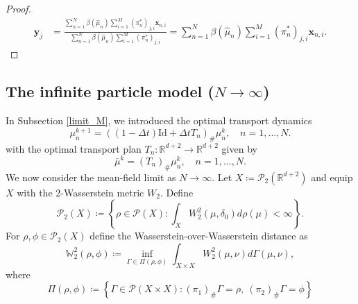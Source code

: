 \documentclass[a4paper, 11pt]{article}
\newcommand{\R}{\mathbb{R}}
\newcommand{\hmu}{\hat{\mu}_{n}}
\newcommand{\Pw}{\mathcal{P}_{2}\left( \R^{d+2} \right) }
\newcommand{\PPw}{\mathcal{P}_{2}\left(X\right)}
\theoremstyle{plain} %
\begin{document}
\begin{proof}
\begin{align}
		\bm{y}_{j} & = \frac{\sum_{n=1}^{N}\beta(\hmu)\sum_{i=1}^{M}\left(\pi^{*}_{n}\right)_{j,i}\bm{x}_{n,i} }{\sum_{n=1}^{N}\beta(\hmu)\sum_{i=1}^{M}\left(\pi^{*}_{n}\right)_{j,i}} = \sum_{n=1}^{N}\beta(\hmu)\sum_{i=1}^{M}\left(\pi^{*}_{n}\right)_{j,i}\bm{x}_{n,i}.
	\end{align}
	\end{proof}

	\subsection{The infinite particle model ($ N \to \infty $)}\label{limit_N}
	In Subsection \ref{limit_M}, we introduced the optimal transport dynamics
	\begin{equation}\label{eq:mean_field_particle_update}
		\mu_{n}^{k+1} = \left( \left( 1 - \Delta t \right)\text{Id} + \Delta t T_{n} \right)_{\#}\mu_{n}^{k},\quad n=1,\dots,N.
	\end{equation}
	with the optimal transport plan $ T_{n} : \R^{d+2} \to \R^{d+2}$ given by
	\begin{equation}
	\bar{\mu}^k = \left( T_{n} \right)_{\#} \mu_{n}^{k}, \quad n=1,\dots,N.
	\end{equation}
	We now consider the mean-field limit as $ N \to \infty$. Let $ X \coloneq \Pw $ and equip $ X $ with the 2-Wasserstein metric $ W_2 $. Define 
	\begin{equation}
		\PPw \coloneq \left\{ \rho \in \mathcal{P}(X): \int_{X} W_2^{2}\left( \mu, \delta_{0} \right) d\rho(\mu) < \infty\right\}.
	\end{equation} 
	For $ \rho, \phi \in \PPw $ define the Wasserstein-over-Wasserstein distance as~\cite{bonet2025flowing,beiglbock2025,pinzi2025}
	\begin{equation}
    \mathbb{W}_{2}^{2}(\rho, \phi) \coloneq \inf_{\Gamma \in \Pi(\rho, \phi)} \int_{X \times X} W_{2}^{2}(\mu, \nu)d \Gamma(\mu,\nu),
	\end{equation}
	where 
	\begin{equation}
		\Pi(\rho, \phi) \coloneq \left \{ \Gamma \in \mathcal{P}\left( X \times X \right) : (\pi_{1})_{\#}\Gamma = \rho,~(\pi_{2})_{\#}\Gamma = \phi\right \}
	\end{equation}
\end{document}
